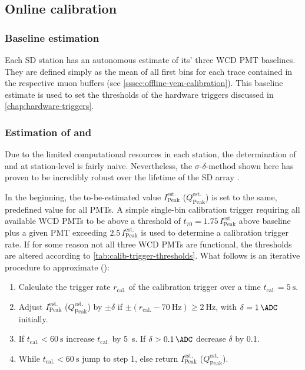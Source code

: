 \subsection{Online calibration}
\label{ssec:online-calibration}

\subsubsection{Baseline estimation}
\label{sssec:online-baseline-estimation}

Each SD station has an autonomous estimate of its' three WCD PMT baselines. They are defined simply as the mean of all first bins for each trace contained in the 
respective muon buffers (see \autoref{sssec:offline-vem-calibration}). This baseline estimate is used to set the thresholds of the hardware triggers discussed in 
\autoref{chap:hardware-triggers}.

\subsubsection{Estimation of \Ipeak and \Qpeak}
\label{sssec:offline-vem-calibration}

Due to the limited computational resources in each station, the determination of \Ipeak and \Qpeak at station-level is fairly naive. Nevertheless, the 
$\sigma$-$\delta$-method shown here has proven to be incredibly robust over the lifetime of the SD array \cite{DesignReport}. 

In the beginning, the to-be-estimated value $I_\text{Peak}^\text{est.}$ ($Q_\text{Peak}^\text{est.}$) is set to the same, predefined value for all PMTs. A simple
single-bin calibration trigger requiring all available WCD PMTs to be above a threshold of $t_{70} = 1.75\,I_\text{Peak}^\text{est.}$ above baseline plus a given 
PMT exceeding $2.5\,I_\text{Peak}^\text{est.}$ is used to determine a calibration trigger rate. If for some reason not all three WCD PMTs are functional, the 
thresholds are altered according to \autoref{tab:calib-trigger-thresholds}. What follows is an iterative procedure to approximate \Ipeak (\Qpeak):

\begin{enumerate}
	\item Calculate the trigger rate $r_\text{cal.}$ of the calibration trigger over a time $t_\text{cal.} = \SI{5}{\second}$.
	\item Adjust $I_\text{Peak}^\text{est.}$ ($Q_\text{Peak}^\text{est.}$) by $\pm\delta$ if $\pm(r_\text{cal.}-\SI{70}{\hertz})\geq\SI{2}{\hertz}$, with
	$\delta = \SI{1}{\ADC}$ initially.
	\item If $t_\text{cal.} < \SI{60}{\second}$ increase $t_\text{cal.}$ by \SI{5}{\second}. If $\delta > \SI{0.1}{\ADC}$ decrease $\delta$ by \SI{0.1}{\ADC}.
	\item While $t_\text{cal.} < \SI{60}{\second}$ jump to step 1, else return $I_\text{Peak}^\text{est.}$ ($Q_\text{Peak}^\text{est.}$).  
\end{enumerate}

